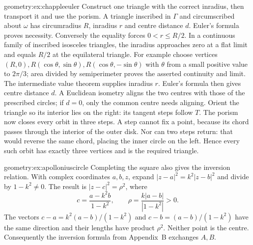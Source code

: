 \begin{solution}{geometry:ex:chappleeuler}
\idea Construct one triangle with the correct inradius, then transport it and use the porism.
\writeup A triangle inscribed in $\Gamma$ and circumscribed about $\omega$ has circumradius $R$, inradius $r$ and centre distance $d$. Euler's formula proves necessity. Conversely the equality forces $0<r\le R/2$. In a continuous family of inscribed isosceles triangles, the inradius approaches zero at a flat limit and equals $R/2$ at the equilateral triangle. For example choose vertices $(R,0),R(\cos\theta,\sin\theta),R(\cos\theta,-\sin\theta)$ with $\theta$ from a small positive value to $2\pi/3$; area divided by semiperimeter proves the asserted continuity and limit. The intermediate value theorem supplies inradius $r$. Euler's formula then gives centre distance $d$. A Euclidean isometry aligns the two centres with those of the prescribed circles; if $d=0$, only the common centre needs aligning. Orient the triangle so its interior lies on the right: its tangent steps follow $T$. The porism now closes every orbit in three steps. A step cannot fix a point, because its chord passes through the interior of the outer disk. Nor can two steps return: that would reverse the same chord, placing the inner circle on the left. Hence every such orbit has exactly three vertices and is the required triangle.
\end{solution}
\begin{solution}{geometry:ex:apolloniuscircle}
\idea Completing the square also gives the inversion relation.
\writeup With complex coordinates $a,b,z$, expand $|z-a|^2=k^2|z-b|^2$ and divide by $1-k^2\ne0$. The result is $|z-c|^2=\rho^2$, where
\[
c=\frac{a-k^2b}{1-k^2},\qquad \rho=\frac{k|a-b|}{|1-k^2|}>0.
\]
The vectors $c-a=k^2(a-b)/(1-k^2)$ and $c-b=(a-b)/(1-k^2)$ have the same direction and their lengths have product $\rho^2$. Neither point is the centre. Consequently the inversion formula from Appendix~B exchanges $A,B$.
\end{solution}

